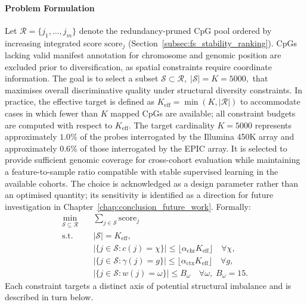 \paragraph{Problem Formulation}

Let $\mathcal{R} = \{j_1, \dots, j_m\}$ denote the 
redundancy-pruned CpG pool ordered by increasing 
integrated score $\mathrm{score}_j$ 
(Section~\ref{subsec:fs_stability_ranking}).
CpGs lacking valid manifest annotation for chromosome and genomic position 
are excluded prior to diversification, as spatial constraints require 
coordinate information.
The goal is to select a subset
\(
\mathcal{S} \subset \mathcal{R},
\;
|\mathcal{S}| = K = 5000,
\)
that maximises overall discriminative quality under 
structural diversity constraints. In practice, the effective target is defined as 
$K_{\mathrm{eff}} = \min(K, |\mathcal{R}|)$ 
to accommodate cases in which fewer than $K$ mapped CpGs are available; 
all constraint budgets are computed with respect to $K_{\mathrm{eff}}$.
The target cardinality $K = 5000$ represents approximately 
$1.0\%$ of the probes interrogated by the Illumina 450K array 
and approximately $0.6\%$ of those interrogated by the EPIC array. 
It is selected to provide sufficient genomic coverage for 
cross-cohort evaluation while maintaining a feature-to-sample 
ratio compatible with stable supervised learning in the 
available cohorts. The choice is acknowledged as a design 
parameter rather than an optimised quantity; its sensitivity 
is identified as a direction for future investigation in 
Chapter~\ref{chap:conclusion_future_work}. %
Formally:
\begin{equation}
\label{eq:div_problem}
\begin{aligned}
\min_{\mathcal{S} \subseteq \mathcal{R}} 
\quad & \sum_{j \in \mathcal{S}} \mathrm{score}_j 
\\
\text{s.t.} \quad 
& |\mathcal{S}| = K_{\mathrm{eff}}, 
\\
& |\{ j \in \mathcal{S} : c(j)=\chi \}| 
  \leq \lfloor \alpha_{\mathrm{chr}} K_{\mathrm{eff}} \rfloor 
  \quad \forall \chi,
\\
& |\{ j \in \mathcal{S} : \gamma(j)=g \}| 
  \leq \lfloor \alpha_{\mathrm{ctx}} K_{\mathrm{eff}} \rfloor 
  \quad \forall g,
\\
& |\{ j \in \mathcal{S} : w(j)=\omega \}| 
  \leq B_{\omega}
  \quad \forall \omega, \; B_{\omega}=15.
\end{aligned}
\end{equation}
Each constraint targets a distinct axis of potential 
structural imbalance and is described in turn below.

